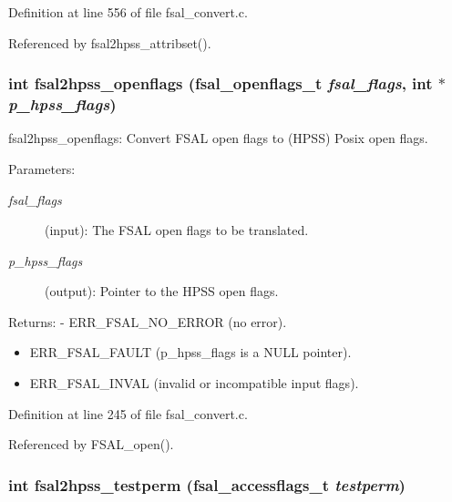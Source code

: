 Definition at line 556 of file fsal\_\-convert.c.

Referenced by fsal2hpss\_\-attribset().
\subsubsection[{fsal2hpss\_\-openflags}]{\setlength{\rightskip}{0pt plus 5cm}int fsal2hpss\_\-openflags (fsal\_\-openflags\_\-t {\em fsal\_\-flags}, \/  int $\ast$ {\em p\_\-hpss\_\-flags})}\label{fsal__convert_8c_835aedeac0e6677dcef16b69e42e2cde}


fsal2hpss\_\-openflags: Convert FSAL open flags to (HPSS) Posix open flags.

\begin{Desc}
\item[Parameters:]
\begin{description}
\item[{\em fsal\_\-flags}](input): The FSAL open flags to be translated. \item[{\em p\_\-hpss\_\-flags}](output): Pointer to the HPSS open flags.\end{description}
\end{Desc}
\begin{Desc}
\item[Returns:]- ERR\_\-FSAL\_\-NO\_\-ERROR (no error).\begin{itemize}
\item ERR\_\-FSAL\_\-FAULT (p\_\-hpss\_\-flags is a NULL pointer).\item ERR\_\-FSAL\_\-INVAL (invalid or incompatible input flags). \end{itemize}
\end{Desc}


Definition at line 245 of file fsal\_\-convert.c.

Referenced by FSAL\_\-open().
\subsubsection[{fsal2hpss\_\-testperm}]{\setlength{\rightskip}{0pt plus 5cm}int fsal2hpss\_\-testperm (fsal\_\-accessflags\_\-t {\em testperm})}\label{fsal__convert_8c_a85a0a90dbf019ac770cbdc2c4b59ca2}


